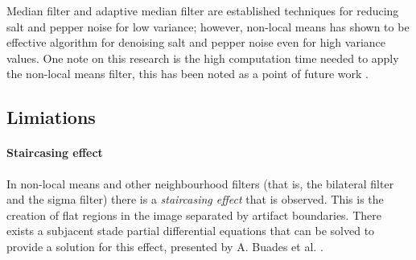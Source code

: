 Median filter and adaptive median filter are established techniques for
reducing salt and pepper noise for low variance; however, non-local means
has shown to be effective algorithm for denoising salt and pepper noise
even for high variance values. One note on this research is the high
computation time needed to apply the non-local means filter, this has been
noted as a point of future work \cite{sarker2012use}.

\subsection{Limiations}

\paragraph{Staircasing effect}

In non-local means and other neighbourhood filters 
(that is, the bilateral filter and the sigma filter)
there is a \emph{staircasing effect} that is observed.
This is the creation of flat regions in the image separated by artifact boundaries.
There exists a subjacent stade partial differential equations that can be solved to provide a solution
for this effect, presented by A. Buades et al. \cite{buades2006staircasing}.
